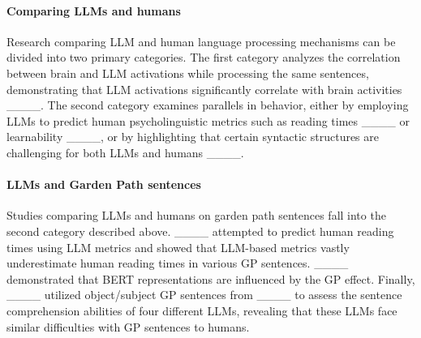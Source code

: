 \paragraph{Comparing LLMs and humans} Research comparing LLM and human language processing mechanisms can be divided into two primary categories. The first category analyzes the correlation between brain and LLM activations while processing the same sentences, demonstrating that LLM activations significantly correlate with brain activities ____. The second category examines parallels in behavior, either by employing LLMs to predict human psycholinguistic metrics such as reading times ____ or learnability ____, or by highlighting that certain syntactic structures are challenging for both LLMs and humans ____.

\paragraph{LLMs and Garden Path sentences} Studies comparing LLMs and humans on garden path sentences fall into the second category described above. ____ attempted to predict human reading times using LLM metrics and showed that LLM-based metrics vastly underestimate human reading times in various GP sentences. ____ demonstrated that BERT representations are influenced by the GP effect. Finally, ____ utilized object/subject GP sentences from ____ to assess the sentence comprehension abilities of four different LLMs, revealing that these LLMs face similar difficulties with GP sentences to humans.